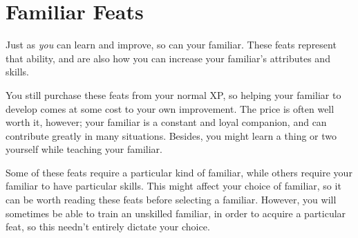 
\section{Familiar Feats}

Just as \emph{you} can learn and improve, so can your familiar.
These feats represent that ability, and are also how you can increase your familiar's attributes and skills.

You still purchase these feats from your normal XP, so helping your familiar to develop comes at some cost to your own improvement.
The price is often well worth it, however; your familiar is a constant and loyal companion, and can contribute greatly in many situations.
Besides, you might learn a thing or two yourself while teaching your familiar.

Some of these feats require a particular kind of familiar, while others require your familiar to have particular skills.
This might affect your choice of familiar, so it can be worth reading these feats before selecting a familiar.
However, you will sometimes be able to train an unskilled familiar, in order to acquire a particular feat, so this needn't entirely dictate your choice.




